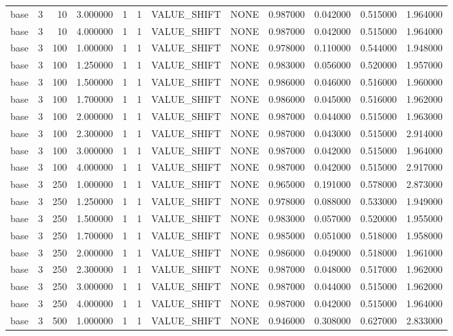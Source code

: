 \begin{tabular}{lrrrllllrrrr}
base & 3 & 10 & 3.000000 & 1 & 1 & VALUE_SHIFT & NONE & 0.987000 & 0.042000 & 0.515000 & 1.964000 \\
base & 3 & 10 & 4.000000 & 1 & 1 & VALUE_SHIFT & NONE & 0.987000 & 0.042000 & 0.515000 & 1.964000 \\
base & 3 & 100 & 1.000000 & 1 & 1 & VALUE_SHIFT & NONE & 0.978000 & 0.110000 & 0.544000 & 1.948000 \\
base & 3 & 100 & 1.250000 & 1 & 1 & VALUE_SHIFT & NONE & 0.983000 & 0.056000 & 0.520000 & 1.957000 \\
base & 3 & 100 & 1.500000 & 1 & 1 & VALUE_SHIFT & NONE & 0.986000 & 0.046000 & 0.516000 & 1.960000 \\
base & 3 & 100 & 1.700000 & 1 & 1 & VALUE_SHIFT & NONE & 0.986000 & 0.045000 & 0.516000 & 1.962000 \\
base & 3 & 100 & 2.000000 & 1 & 1 & VALUE_SHIFT & NONE & 0.987000 & 0.044000 & 0.515000 & 1.963000 \\
base & 3 & 100 & 2.300000 & 1 & 1 & VALUE_SHIFT & NONE & 0.987000 & 0.043000 & 0.515000 & 2.914000 \\
base & 3 & 100 & 3.000000 & 1 & 1 & VALUE_SHIFT & NONE & 0.987000 & 0.042000 & 0.515000 & 1.964000 \\
base & 3 & 100 & 4.000000 & 1 & 1 & VALUE_SHIFT & NONE & 0.987000 & 0.042000 & 0.515000 & 2.917000 \\
base & 3 & 250 & 1.000000 & 1 & 1 & VALUE_SHIFT & NONE & 0.965000 & 0.191000 & 0.578000 & 2.873000 \\
base & 3 & 250 & 1.250000 & 1 & 1 & VALUE_SHIFT & NONE & 0.978000 & 0.088000 & 0.533000 & 1.949000 \\
base & 3 & 250 & 1.500000 & 1 & 1 & VALUE_SHIFT & NONE & 0.983000 & 0.057000 & 0.520000 & 1.955000 \\
base & 3 & 250 & 1.700000 & 1 & 1 & VALUE_SHIFT & NONE & 0.985000 & 0.051000 & 0.518000 & 1.958000 \\
base & 3 & 250 & 2.000000 & 1 & 1 & VALUE_SHIFT & NONE & 0.986000 & 0.049000 & 0.518000 & 1.961000 \\
base & 3 & 250 & 2.300000 & 1 & 1 & VALUE_SHIFT & NONE & 0.987000 & 0.048000 & 0.517000 & 1.962000 \\
base & 3 & 250 & 3.000000 & 1 & 1 & VALUE_SHIFT & NONE & 0.987000 & 0.044000 & 0.515000 & 1.962000 \\
base & 3 & 250 & 4.000000 & 1 & 1 & VALUE_SHIFT & NONE & 0.987000 & 0.042000 & 0.515000 & 1.964000 \\
base & 3 & 500 & 1.000000 & 1 & 1 & VALUE_SHIFT & NONE & 0.946000 & 0.308000 & 0.627000 & 2.833000 \\

\end{tabular}
